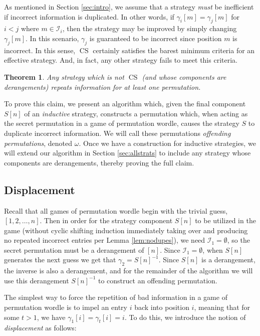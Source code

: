 \documentclass[article]{amsart}
\theoremstyle{plain}
\newtheorem{theorem}{Theorem}
\DeclareMathOperator{\CS}{CS}
\begin{document}
As mentioned in Section \ref{sec:intro}, we assume that a strategy \textit{must} be inefficient if incorrect information is duplicated. In other words, if $\gamma_i[m] = \gamma_j[m]$ for $i < j$ where $m \in \mathcal{I}_i$, then the strategy may be improved by simply changing $\gamma_j[m]$. In this scenario, $\gamma_j$ is guaranteed to be incorrect since position $m$ is incorrect. In this sense, $\CS$ certainly satisfies the barest minimum criteria for an effective strategy. And, in fact, any other strategy fails to meet this criteria.

\begin{theorem} \label{thm:alldupe}
    Any strategy which is \textit{not} $\CS$ (and whose components are derangements) repeats information for at least one permutation.
\end{theorem}

To prove this claim, we present an algorithm which, given the final component $S[n]$ of an \textit{inductive} strategy, constructs a permutation which, when acting as the secret permutation in a game of permutation wordle, causes the strategy $S$ to duplicate incorrect information. We will call these permutations \textit{offending permutations}, denoted $\omega$. Once we have a construction for inductive strategies, we will extend our algorithm in Section \ref{sec:allstrats} to include any strategy whose components are derangements, thereby proving the full claim. 

\subsection{Displacement} \label{sub:disvec}

Recall that all games of permutation wordle begin with the trivial guess, $[1,2,\dots, n]$. Then in order for the strategy component $S[n]$ to be utilized in the game (without cyclic shifting induction immediately taking over and producing no repeated incorrect entries per Lemma \ref{lem:nodupes}), we need $\mathcal{I}_1 = \emptyset$, so the secret permutation must be a derangement of $[n]$. Since $\mathcal{I}_1 = \emptyset$, when $S[n]$ generates the next guess we get that $\gamma_2 = S[n]^{-1}$. Since $S[n]$ is a derangement, the inverse is also a derangement, and for the remainder of the algorithm we will use this derangement $S[n]^{-1}$ to construct an offending permutation. 

The simplest way to force the repetition of bad information in a game of permutation wordle is to impel an entry $i$ back into position $i$, meaning that for some $t > 1$, we have $\gamma_1[i] = \gamma_t[i] = i$. To do this, we introduce the notion of \textit{displacement} as follows: 
\end{document}
